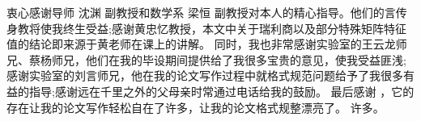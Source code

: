 \begin{acknowledgement}
  衷心感谢导师 沈渊 副教授和数学系 梁恒 副教授对本人的精心指导。他们的言传身教将使我终生受益;感谢黄忠忆教授，本文中关于瑞利商以及部分特殊矩阵特征值的结论即来源于黄老师在课上的讲解。
  同时，我也非常感谢实验室的王云龙师兄、蔡杨师兄，他们在我的毕设期间提供给了我很多宝贵的意见，使我受益匪浅;感谢实验室的刘言师兄，他在我的论文写作过程中就格式规范问题给予了我很多有益的指导;感谢远在千里之外的父母亲时常通过电话给我的鼓励。
  最后感谢 \thuthesis，它的存在让我的论文写作轻松自在了许多，让我的论文格式规整漂亮了。
  许多。
\end{acknowledgement}
